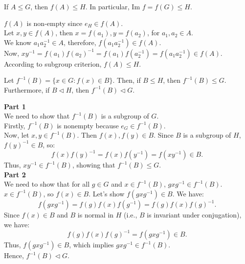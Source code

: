 \begin{prop}
    If $A \le G$, then $f(A) \le H$. In particular, Im $f = f(G) \le H$.
\end{prop}
\begin{propproof}
    $f(A)$ is non-empty since $e_H \in f(A)$.\\
    Let $x, y \in f(A)$, then $x=f(a_1), y=f(a_2)$, for $a_1, a_2 \in A$.\\
    We know $a_1a_2^{-1} \in A$, therefore, $f(a_1a_2^{-1}) \in f(A).$\\
    Now, $xy^{-1} = f(a_1)f(a_2)^{-1} = f(a_1)f(a_2^{-1}) = f(a_1a_2^{-1}) \in f(A).$\\
    According to subgroup criterion, $f(A) \le H$.
\end{propproof}
\begin{prop}
    Let $f^{-1}(B) = \{x \in G: f(x) \in B\}$. Then, if $B \le H$, then $f^{-1}(B) \le G$. Furthermore, if $B \lhd H$, then $f^{-1}(B) \lhd G$.
\end{prop}
\begin{propproof}
    \textbf{Part 1}\\
    We need to show that \( f^{-1}(B) \) is a subgroup of \( G \).\\
    Firstly, \( f^{-1}(B) \) is nonempty because $e_G \in f^{-1}(B).$\\
    Now, let \( x, y \in f^{-1}(B) \). Then \( f(x), f(y) \in B \). Since \( B \) is a subgroup of \( H \), $f(y)^{-1} \in B$, so:
    $$f(x) f(y)^{-1} = f(x) f(y^{-1}) = f(xy^{-1}) \in B.$$
    Thus, \( xy^{-1} \in f^{-1}(B) \), showing that \( f^{-1}(B) \le G\).\\
    \textbf{Part 2}\\
    We need to show that for all $g \in G$ and $x \in f^{-1}(B)$, $gxg^{-1} \in f^{-1}(B)$. \( x \in f^{-1}(B) \), so \( f(x) \in B \). Let's show $f(gxg^{-1}) \in B$.
    We have:
    \[
    f(gxg^{-1}) = f(g) f(x) f(g^{-1}) = f(g) f(x) f(g)^{-1}.
    \]
    Since \( f(x) \in B \) and \( B \) is normal in \( H \) (i.e., \( B \) is invariant under conjugation), we have:
    \[
    f(g) f(x) f(g)^{-1} = f(gxg^{-1})\in B.
    \]
    Thus, \( f(gxg^{-1}) \in B \), which implies \( gxg^{-1} \in f^{-1}(B) \).\\
    Hence, $f^{-1}(B) \lhd G$.
\end{propproof}

